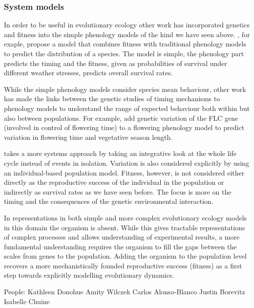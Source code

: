 \documentclass[phd]{infthesis}
\begin{document}
\subsubsection*{System models}
In order to be useful in evolutionary ecology other work has incorporated
genetics and fitness into the simple phenology models of the kind we have seen
above. \citet{chuine_phenology_2001}, for exaple, propose a model that combines
fitness with traditional phenology models to predict the distribution of a
species. The model is simple, the phenology part predicts the timing and the
fitness, given as probabilities of survival under different weather stresses,
predicts overall survival rates.

While the simple phenology models consider species mean behaviour, other work
has made the links between the genetic studies of timing mechanisms to phenology
models to understand the range of expected behaviour both within but also
between populations. For example, \citet{wilczek_effects_2009} add genetic
variation of the FLC gene (involved in control of flowering time) to a flowering
phenology model to predict variation in flowering time and vegetative season
length.

\citet{burghardt_modeling_2015} takes a more systems approach by taking an
integrative look at the whole life cycle instead of events in
isolation. Variation is also considered explicitly by using an individual-based
population model. Fitness, however, is not considered either directly as the
reproductive success of the individual in the population or indirectly as
survival rates as we have seen before. The focus is more on the timing and the
consequences of the genetic environmental interaction.

In representations in both simple and more complex evolutionary ecology models
in this domain the organism is absent. While this gives tractable
representations of complex processes and allows understanding of experimental
results, a more fundamental understanding requires the organism to fill the gaps
between the scales from genes to the population. Adding the organism to the
population level recovers a more mechanistically founded reproductive success
(fitness) as a first step towards explicitly modelling evolutionary dynamics.

People:
Kathleen Donohue
Amity Wilczek
Carlos Alonso-Blanco
Justin Borevitz
Isabelle Chuine

\end{document}
